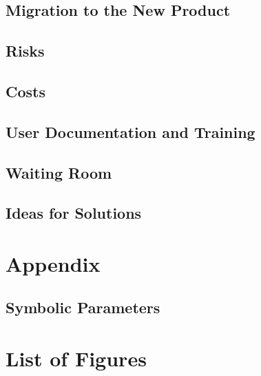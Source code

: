 \documentclass{article}
\begin{document}
		\subsection{Migration to the New Product}
		\subsection{Risks}
		\subsection{Costs}
		\subsection{User Documentation and Training}
		\subsection{Waiting Room}
		\subsection{Ideas for Solutions}
		
	\newpage
	\section*{Appendix}
	\subsection*{Symbolic Parameters}
	
	\newpage
	\section*{List of Figures}		
		
\end{document}
